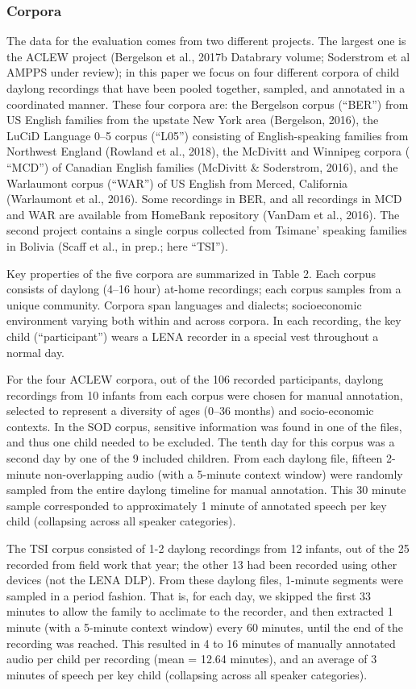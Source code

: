 \documentclass[english,floatsintext,man]{apa6}
\begin{document}
\subsubsection{Corpora}\label{corpora}

The data for the evaluation comes from two different projects. The
largest one is the ACLEW project (Bergelson et al., 2017b Databrary
volume; Soderstrom et al AMPPS under review); in this paper we focus on
four different corpora of child daylong recordings that have been pooled
together, sampled, and annotated in a coordinated manner. These four
corpora are: the Bergelson corpus (\enquote{BER}) from US English
families from the upstate New York area (Bergelson, 2016), the LuCiD
Language 0--5 corpus (\enquote{L05}) consisting of English-speaking
families from Northwest England (Rowland et al., 2018), the McDivitt and
Winnipeg corpora ( \enquote{MCD}) of Canadian English families (McDivitt
\& Soderstrom, 2016), and the Warlaumont corpus (\enquote{WAR}) of US
English from Merced, California (Warlaumont et al., 2016). Some
recordings in BER, and all recordings in MCD and WAR are available from
HomeBank repository (VanDam et al., 2016). The second project contains a
single corpus collected from Tsimane' speaking families in Bolivia
(Scaff et al., in prep.; here \enquote{TSI}).

Key properties of the five corpora are summarized in Table 2. Each
corpus consists of daylong (4--16 hour) at-home recordings; each corpus
samples from a unique community. Corpora span languages and dialects;
socioeconomic environment varying both within and across corpora. In
each recording, the key child (\enquote{participant}) wears a LENA
recorder in a special vest throughout a normal day.

For the four ACLEW corpora, out of the 106 recorded participants,
daylong recordings from 10 infants from each corpus were chosen for
manual annotation, selected to represent a diversity of ages (0--36
months) and socio-economic contexts. In the SOD corpus, sensitive
information was found in one of the files, and thus one child needed to
be excluded. The tenth day for this corpus was a second day by one of
the 9 included children. From each daylong file, fifteen 2-minute
non-overlapping audio (with a 5-minute context window) were randomly
sampled from the entire daylong timeline for manual annotation. This 30
minute sample corresponded to approximately 1 minute of annotated speech
per key child (collapsing across all speaker categories).

The TSI corpus consisted of 1-2 daylong recordings from 12 infants, out
of the 25 recorded from field work that year; the other 13 had been
recorded using other devices (not the LENA DLP). From these daylong
files, 1-minute segments were sampled in a period fashion. That is, for
each day, we skipped the first 33 minutes to allow the family to
acclimate to the recorder, and then extracted 1 minute (with a 5-minute
context window) every 60 minutes, until the end of the recording was
reached. This resulted in 4 to 16 minutes of manually annotated audio
per child per recording (mean = 12.64 minutes), and an average of 3
minutes of speech per key child (collapsing across all speaker
categories).
\end{document}

